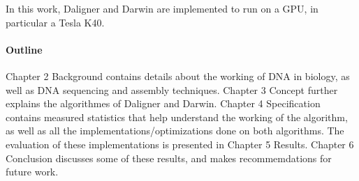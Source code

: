 \documentclass[../main/thesis.tex]{subfiles}
\begin{document}
In this work, Daligner and Darwin are implemented to run on a GPU, in particular a Tesla K40.

\paragraph{Outline}
Chapter 2 Background contains details about the working of DNA in biology, as well as DNA sequencing and assembly techniques.
Chapter 3 Concept further explains the algorithmes of Daligner and Darwin.
Chapter 4 Specification contains measured statistics that help understand the working of the algorithm, as well as all the implementations/optimizations done on both algorithms.
The evaluation of these implementations is presented in Chapter 5 Results.
Chapter 6 Conclusion discusses some of these results, and makes recommemdations for future work.
\end{document}
